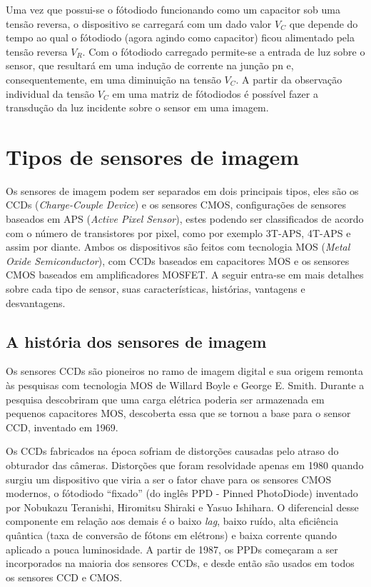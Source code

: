 \documentclass[10pt,a4paper,twocolumn]{article}
\begin{document}
		Uma vez que possui-se o fótodiodo funcionando como um capacitor sob uma tensão reversa, o dispositivo se carregará com um dado valor $V_{C}$ que depende do tempo ao qual o fótodiodo (agora agindo como capacitor) ficou alimentado pela tensão reversa $V_{R}$. Com o fótodiodo carregado permite-se a entrada de luz sobre o sensor, que resultará em uma indução de corrente na junção pn e, consequentemente, em uma diminuição na tensão $V_{C}$. A partir da observação individual da tensão $V_{C}$ em uma matriz de fótodiodos é possível fazer a transdução da luz incidente sobre o sensor em uma imagem.
		
\section*{Tipos de sensores de imagem}
		Os sensores de imagem podem ser separados em dois principais tipos, eles são os CCDs (\textit{Charge-Couple Device}) e os sensores CMOS, configurações de sensores baseados em APS (\textit{Active Pixel Sensor}), estes podendo ser classificados de acordo com o número de transistores por pixel, como por exemplo 3T-APS, 4T-APS e assim por diante. Ambos os dispositivos são feitos com tecnologia MOS (\textit{Metal Oxide Semiconductor}), com CCDs baseados em capacitores MOS e os sensores CMOS baseados em amplificadores MOSFET. A seguir entra-se em mais detalhes sobre cada tipo de sensor, suas características, histórias, vantagens e desvantagens.
		
	\subsection*{A história dos sensores de imagem}
		Os sensores CCDs são pioneiros no ramo de imagem digital e sua origem remonta às pesquisas com tecnologia MOS de Willard Boyle e George E. Smith. Durante a pesquisa descobriram que uma carga elétrica poderia ser armazenada em pequenos capacitores MOS, descoberta essa que se tornou a base para o sensor CCD, inventado em 1969.
		
		Os CCDs fabricados na época sofriam de distorções causadas pelo atraso do obturador das câmeras. Distorções que foram resolvidade apenas em 1980 quando surgiu um dispositivo que viria a ser o fator chave para os sensores CMOS modernos, o fótodiodo ``fixado'' (do inglês PPD - Pinned PhotoDiode) inventado por Nobukazu Teranishi, Hiromitsu Shiraki e Yasuo Ishihara. O diferencial desse componente em relação aos demais é o baixo \textit{lag}, baixo ruído, alta eficiência quântica (taxa de conversão de fótons em elétrons) e baixa corrente quando aplicado a pouca luminosidade. A partir de 1987, os PPDs começaram a ser incorporados na maioria dos sensores CCDs, e desde então são usados em todos os sensores CCD e CMOS.
		
\end{document}
